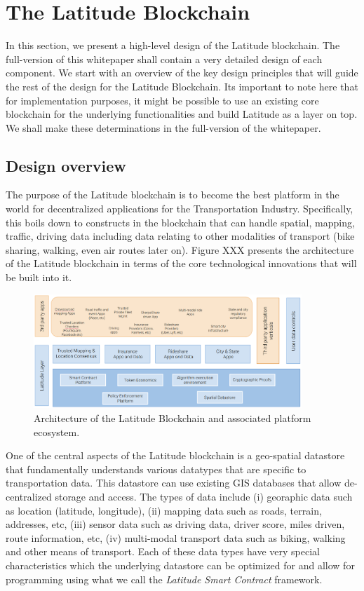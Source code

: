 \section{The Latitude Blockchain}\label{sec:design}

In this section, we present a high-level design of the Latitude blockchain. The full-version of this whitepaper shall
contain a very detailed design of each component. We start with an overview of the key design principles that will guide
the rest of the design for the Latitude Blockchain. Its important to note here that for implementation purposes, it
might be possible to use an existing core blockchain for the underlying functionalities and build Latitude as a layer on
top. We shall make these determinations in the full-version of the whitepaper.

\subsection{Design overview}

The purpose of the Latitude blockchain is to become the best platform in the world for decentralized applications for
the Transportation Industry. Specifically, this boils down to constructs in the blockchain that can handle spatial,
mapping, traffic, driving data including data relating to other modalities of transport (bike sharing, walking, even air
routes later on). Figure XXX presents the architecture of the Latitude blockchain in terms of the core technological
innovations that will be built into it.

\begin{figure}[t]
    \centering
    \includegraphics[width=0.90\textwidth]{latarch.png}
  \caption{Architecture of the Latitude Blockchain and associated platform ecosystem.}
    \label{fig:lat-arch}
\end{figure}

One of the central aspects of the Latitude blockchain is a geo-spatial datastore that fundamentally understands various
datatypes that are specific to transportation data. This datastore can use existing GIS databases that allow
de-centralized storage and access. The types of data include (i) georaphic data such as location (latitude, longitude),
(ii) mapping data such as roads, terrain, addresses, etc, (iii) sensor data such as driving data, driver score, miles
driven, route information, etc, (iv) multi-modal transport data such as biking, walking and other means of transport.
Each of these data types have very special characteristics which the underlying datastore can be optimized for and allow
for programming using what we call the {\em Latitude Smart Contract} framework. 

